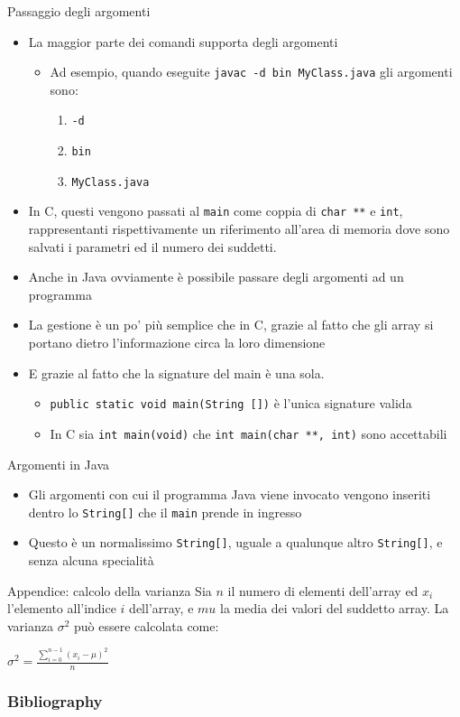 \documentclass[presentation]{beamer}
\begin{document}
\begin{frame}{Passaggio degli argomenti}
	\begin{itemize}
		\item La maggior parte dei comandi supporta degli argomenti
		\begin{itemize}
			\item Ad esempio, quando eseguite \texttt{javac -d bin MyClass.java} gli argomenti sono:
			\begin{enumerate}
			 \item \texttt{-d}
			 \item \texttt{bin}
			 \item \texttt{MyClass.java}
			\end{enumerate}
		\end{itemize}
		\item In C, questi vengono passati al \texttt{main} come coppia di \texttt{char **} e \texttt{int}, rappresentanti rispettivamente un riferimento all'area di memoria dove sono salvati i parametri ed il numero dei suddetti.
		\item Anche in Java ovviamente è possibile passare degli argomenti ad un programma 
		\item La gestione è un po' più semplice che in C, grazie al fatto che gli array si portano dietro l'informazione circa la loro dimensione
		\item E grazie al fatto che la signature del main è una sola.
		\begin{itemize}
			\item \texttt{public static void main(String [])} è l'unica signature valida
			\item In C sia \texttt{int main(void)} che \texttt{int main(char **, int)} sono accettabili
		\end{itemize}
	\end{itemize}
\end{frame}

\begin{frame}{Argomenti in Java}
	\begin{itemize}
		\item Gli argomenti con cui il programma Java viene invocato vengono inseriti dentro lo \texttt{String[]} che il \texttt{main} prende in ingresso
		\item Questo è un normalissimo \texttt{String[]}, uguale a qualunque altro \texttt{String[]}, e senza alcuna specialità
	\end{itemize}
\end{frame}

\begin{frame}{Appendice: calcolo della varianza}
    Sia $n$ il numero di elementi dell'array ed $x_i$ l'elemento all'indice $i$ dell'array, e $mu$ 
    la media dei valori del suddetto array. La varianza $\sigma^2$ può essere calcolata come:
    
    \centering
    \Huge
    $\sigma^2 = \frac{\displaystyle\sum_{i=0}^{n-1}(x_i - \mu)^2} {n}$
\end{frame}

\begin{frame}[allowframebreaks]
 \frametitle{Bibliography}
	
	\small
 
\end{frame}
\end{document}
